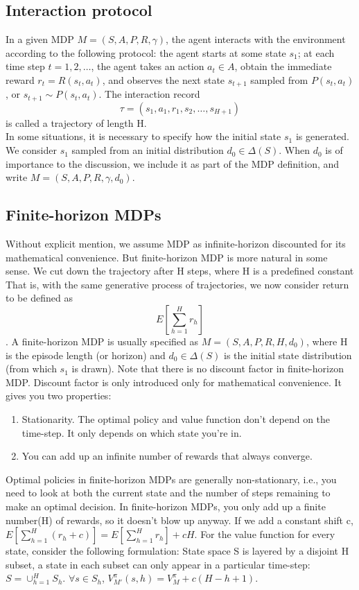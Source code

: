 \documentclass{report}
\begin{document}
\subsection{Interaction protocol}
In a given MDP $M=(S,A,P,R,\gamma)$, the agent interacts with the environment according to the following protocol: the agent starts at some state $s_1$; at each time step $t = 1, 2, \hdots $, the agent takes an action $a_t \in A$, obtain the immediate reward $r_t=R(s_t,a_t)$, and observes the next state $s_{t+1}$ sampled from $P(s_t, a_t)$ , or $s_{t+1}\sim P(s_t,a_t)$. The interaction record \[ \tau=(s_1,a_1,r_1,s_2,\hdots,s_{H+1})\] is called a trajectory of length H. \\
In some situations, it is necessary to specify how the initial state $s_1$ is generated. We consider $s_1$ sampled from an initial distribution $d_0 \in \Delta(S)$. When $d_0$ is of importance to the discussion, we include it as part of the MDP definition, and write $M = (S, A, P, R, \gamma, d_0)$.

\subsection{Finite-horizon MDPs}
Without explicit mention, we assume MDP as infinite-horizon discounted for its mathematical convenience. But finite-horizon MDP is more natural in some sense. We cut down the trajectory after H steps, where H is a predefined constant That is, with the same generative process of trajectories, we now consider return to be defined as \[E[\sum_{h=1}^{H} r_h]\]. A finite-horizon MDP is usually specified as $M=(S,A,P,R,H,d_0)$, where H is the episode length (or horizon) and $d_0 \in \Delta(S)$ is the initial state distribution (from which $s_1$ is drawn).  Note that there is no discount factor in finite-horizon MDP. Discount factor is only introduced only for mathematical convenience. It gives you two properties:
\begin{enumerate}
    \item Stationarity. The optimal policy and value function don't depend on the time-step. It only depends on which state you're in.
    \item You can add up an infinite number of rewards that always converge.
\end{enumerate}
Optimal policies in finite-horizon MDPs are generally non-stationary, i.e., you need to look at both the current state and the number of steps remaining to make an optimal decision. In finite-horizon MDPs, you only add up a finite number(H) of rewards, so it doesn't blow up anyway. If we add a constant shift c, $E[\sum_{h=1}^{H} (r_h+c)]=E[\sum_{h=1}^{H} r_h] + cH$. For the value function for every state, consider the following formulation: State space S is layered by a disjoint H subset, a state in each subset can only appear in a particular time-step: $S=\cup_{h=1}^{H}S_h$. $\forall s \in S_h$, $V_{M'}^{\pi}(s,h)=V_{M}^{\pi}+c(H-h+1)$.
\end{document}
